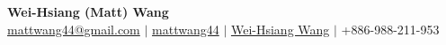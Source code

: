 \documentclass[letterpaper,11pt]{article}
\begin{document}

\begin{center}
  \textbf{\Large Wei-Hsiang (Matt) Wang} \\
  \vspace{8px}
  \href{mailto:mattwang44@gmail.com}{\faEnvelope \hspace{1px} mattwang44@gmail.com} {{$\vert$}}
  \href{https://github.com/mattwang44/}{\faGithub \hspace{1px} mattwang44} {{$\vert$}}
  \href{https://www.linkedin.com/in/weihsiang-wang/}{\faLinkedin \hspace{1px} Wei-Hsiang Wang} {{$\vert$}}
  { \faPhoneSquare \hspace{1px} +886-988-211-953}
\end{center}

\vspace{-8px}
\end{document}

